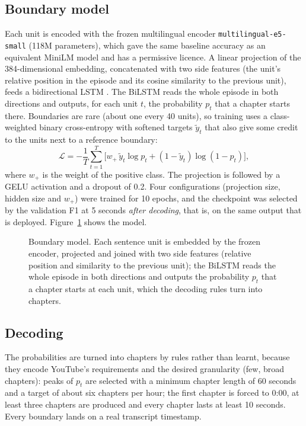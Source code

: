 \subsection*{Boundary model}

Each unit is encoded with the frozen multilingual encoder \texttt{multilingual-e5-small} \cite{wang2024me5} (118M parameters), which gave the same baseline accuracy as an equivalent MiniLM model and has a permissive licence. A linear projection of the 384-dimensional embedding, concatenated with two side features (the unit's relative position in the episode and its cosine similarity to the previous unit), feeds a bidirectional LSTM \cite{hochreiter1997lstm, koshorek2018textseg}. The BiLSTM reads the whole episode in both directions and outputs, for each unit $t$, the probability $p_t$ that a chapter starts there. Boundaries are rare (about one every 40 units), so training uses a class-weighted binary cross-entropy with softened targets $\tilde y_t$ that also give some credit to the units next to a reference boundary:
\begin{equation}
\mathcal{L} = -\frac{1}{T}\sum_{t=1}^{T}\Big[w_{+}\,\tilde y_t\log p_t + (1-\tilde y_t)\log(1-p_t)\Big],
\label{eq:bce}
\end{equation}
where $w_{+}$ is the weight of the positive class. The projection is followed by a GELU activation and a dropout of 0.2. Four configurations (projection size, hidden size and $w_{+}$) were trained for 10 epochs, and the checkpoint was selected by the validation F1 at 5 seconds \textit{after decoding}, that is, on the same output that is deployed. Figure~\ref{fig:bilstm-chapters} shows the model.

\begin{figure}[H]
\centering
{}
\caption{Boundary model. Each sentence unit is embedded by the frozen encoder, projected and joined with two side features (relative position and similarity to the previous unit); the BiLSTM reads the whole episode in both directions and outputs the probability $p_t$ that a chapter starts at each unit, which the decoding rules turn into chapters.}
\label{fig:bilstm-chapters}
\end{figure}

\subsection*{Decoding}

The probabilities are turned into chapters by rules rather than learnt, because they encode YouTube's requirements and the desired granularity (few, broad chapters): peaks of $p_t$ are selected with a minimum chapter length of 60 seconds and a target of about six chapters per hour; the first chapter is forced to 0:00, at least three chapters are produced and every chapter lasts at least 10 seconds. Every boundary lands on a real transcript timestamp.


